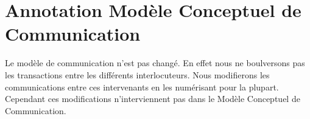 \section{Annotation Modèle Conceptuel de Communication}

Le modèle de communication n'est pas changé. En effet nous ne boulversons pas
les transactions entre les différents interlocuteurs. Nous modifierons les 
communications entre ces intervenants en les numérisant pour la plupart.
Cependant ces modifications n'interviennent pas dans le Modèle Conceptuel
de Communication.
